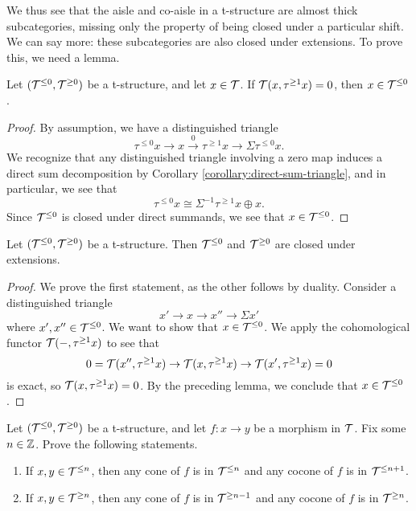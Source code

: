 We thus see that the aisle and co-aisle in a t-structure are almost thick subcategories, missing only the property of being closed under a particular shift.
We can say more: these subcategories are also closed under extensions. To prove this, we need a lemma.
\begin{lemma}\label{lemma:t-structure-aisle-from-trivial-mapping-to-truncation}
	Let \((\mathcal{T}^{\leq 0},\mathcal{T}^{\geq0})\) be a t-structure, and let \(x\in\mathcal{T}\). If \(\mathcal{T}(x,\tau^{\geq 1}x)=0\), then \(x\in\mathcal{T}^{\leq 0}\).
\end{lemma}
\begin{proof}
By assumption, we have a distinguished triangle
\[ \tau^{\leq 0}x\to x \overset{0}\to \tau^{\geq 1}x \to \Sigma\tau^{\leq 0}x. \]
We recognize that any distinguished triangle involving a zero map induces a direct sum decomposition by Corollary \ref{corollary:direct-sum-triangle}, and in particular, we see that
\[ \tau^{\leq 0}x\cong \Sigma^{-1}\tau^{\geq 1}x \oplus x. \]
Since \(\mathcal{T}^{\leq 0}\) is closed under direct summands, we see that \(x\in\mathcal{T}^{\leq 0}\).
\end{proof}
\begin{proposition}\label{prop:t-structure-closure-under-extension}
	Let \((\mathcal{T}^{\leq 0},\mathcal{T}^{\geq0})\) be a t-structure. Then \(\mathcal{T}^{\leq 0}\) and \(\mathcal{T}^{\geq 0}\) are closed under extensions.
\end{proposition}
\begin{proof}
We prove the first statement, as the other follows by duality. Consider a distinguished triangle
\[ x' \to x \to x'' \to \Sigma x' \]
where \(x',x''\in\mathcal{T}^{\leq 0}\). We want to show that \(x\in\mathcal{T}^{\leq 0}\). We apply the cohomological functor \(\mathcal{T}(-,\tau^{\geq 1}x)\) to see that
\[ 0 = \mathcal{T}(x'',\tau^{\geq 1}x) \to \mathcal{T}(x,\tau^{\geq 1}x) \to \mathcal{T}(x',\tau^{\geq 1}x) = 0 \]
is exact, so \(\mathcal{T}(x,\tau^{\geq 1}x) = 0\). By the preceding lemma, we conclude that \(x\in\mathcal{T}^{\leq 0}\).
\end{proof}
\begin{exercise}\label{exercise:t-structures-cones-of-morphisms-in-aisle}
	Let \((\mathcal{T}^{\leq 0},\mathcal{T}^{\geq0})\) be a t-structure, and let \(f\!:x\to y\) be a morphism in \(\mathcal{T}\). Fix some \(n\in\mathbb{Z}\). Prove the following statements.
	\begin{enumerate}[label=(\arabic*)]
		\item If \(x,y\in\mathcal{T}^{\leq n}\), then any cone of \(f\) is in \(\mathcal{T}^{\leq n}\) and any cocone of \(f\) is in \(\mathcal{T}^{\leq n+1}\).
		\item If \(x,y\in\mathcal{T}^{\geq n}\), then any cone of \(f\) is in \(\mathcal{T}^{\geq n-1}\) and any cocone of \(f\) is in \(\mathcal{T}^{\geq n}\).
	\end{enumerate}
\end{exercise}

